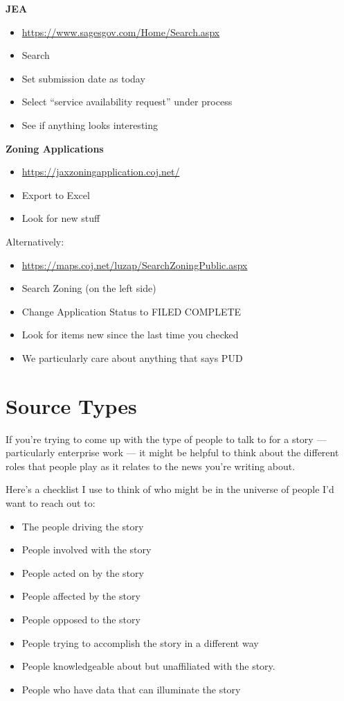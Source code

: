 \documentclass[
  12pt,
  american,
  letterpaperpaper,
  extrafontsizes,onecolumn,openright
  ]{memoir}
\providecommand{\tightlist}{%
  \setlength{\itemsep}{0pt}\setlength{\parskip}{0pt}}
\begin{document}
\textbf{JEA}

\begin{itemize}
\tightlist
\item
  \url{https://www.sagesgov.com/Home/Search.aspx}
\item
  Search
\item
  Set submission date as today
\item
  Select \enquote{service availability request} under process
\item
  See if anything looks interesting
\end{itemize}

\textbf{Zoning Applications}

\begin{itemize}
\tightlist
\item
  \url{https://jaxzoningapplication.coj.net/}
\item
  Export to Excel
\item
  Look for new stuff
\end{itemize}

Alternatively:

\begin{itemize}
\tightlist
\item
  \url{https://maps.coj.net/luzap/SearchZoningPublic.aspx}
\item
  Search Zoning (on the left side)
\item
  Change Application Status to FILED COMPLETE
\item
  Look for items new since the last time you checked
\item
  We particularly care about anything that says PUD
\end{itemize}

\hypertarget{source-types}{%
\chapter{Source Types}\label{source-types}}

If you're trying to come up with the type of people to talk to for a story --- particularly enterprise work --- it might be helpful to think about the different roles that people play as it relates to the news you're writing about.

Here's a checklist I use to think of who might be in the universe of people I'd want to reach out to:

\begin{itemize}
\tightlist
\item
  The people driving the story
\item
  People involved with the story
\item
  People acted on by the story
\item
  People affected by the story
\item
  People opposed to the story
\item
  People trying to accomplish the story in a different way
\item
  People knowledgeable about but unaffiliated with the story.
\item
  People who have data that can illuminate the story
\end{itemize}
\end{document}
